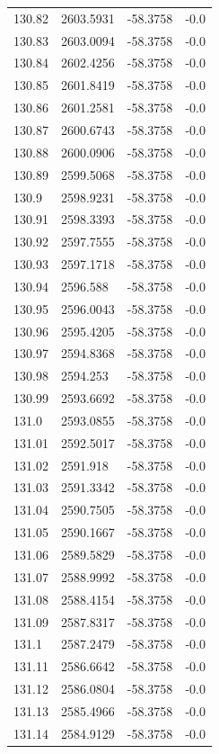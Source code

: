 \begin{table}[H]
\begin{tabular}{llll}
130.82 & 2603.5931 & -58.3758 & -0.0 \\
130.83 & 2603.0094 & -58.3758 & -0.0 \\
130.84 & 2602.4256 & -58.3758 & -0.0 \\
130.85 & 2601.8419 & -58.3758 & -0.0 \\
130.86 & 2601.2581 & -58.3758 & -0.0 \\
130.87 & 2600.6743 & -58.3758 & -0.0 \\
130.88 & 2600.0906 & -58.3758 & -0.0 \\
130.89 & 2599.5068 & -58.3758 & -0.0 \\
130.9 & 2598.9231 & -58.3758 & -0.0 \\
130.91 & 2598.3393 & -58.3758 & -0.0 \\
130.92 & 2597.7555 & -58.3758 & -0.0 \\
130.93 & 2597.1718 & -58.3758 & -0.0 \\
130.94 & 2596.588 & -58.3758 & -0.0 \\
130.95 & 2596.0043 & -58.3758 & -0.0 \\
130.96 & 2595.4205 & -58.3758 & -0.0 \\
130.97 & 2594.8368 & -58.3758 & -0.0 \\
130.98 & 2594.253 & -58.3758 & -0.0 \\
130.99 & 2593.6692 & -58.3758 & -0.0 \\
131.0 & 2593.0855 & -58.3758 & -0.0 \\
131.01 & 2592.5017 & -58.3758 & -0.0 \\
131.02 & 2591.918 & -58.3758 & -0.0 \\
131.03 & 2591.3342 & -58.3758 & -0.0 \\
131.04 & 2590.7505 & -58.3758 & -0.0 \\
131.05 & 2590.1667 & -58.3758 & -0.0 \\
131.06 & 2589.5829 & -58.3758 & -0.0 \\
131.07 & 2588.9992 & -58.3758 & -0.0 \\
131.08 & 2588.4154 & -58.3758 & -0.0 \\
131.09 & 2587.8317 & -58.3758 & -0.0 \\
131.1 & 2587.2479 & -58.3758 & -0.0 \\
131.11 & 2586.6642 & -58.3758 & -0.0 \\
131.12 & 2586.0804 & -58.3758 & -0.0 \\
131.13 & 2585.4966 & -58.3758 & -0.0 \\
131.14 & 2584.9129 & -58.3758 & -0.0 \\

\end{tabular}
\end{table}
